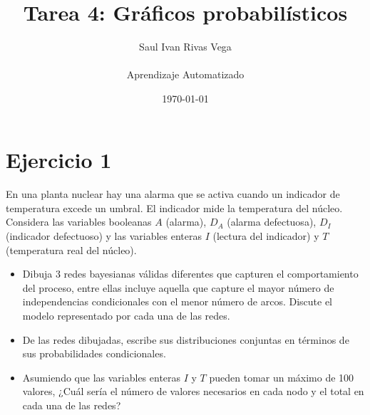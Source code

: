 \documentclass[12pt]{article}
\title{Tarea 4: Gráficos probabilísticos}
\author{
	Saul Ivan Rivas Vega \\
	\\
	Aprendizaje Automatizado\\
}
\date{\today}
\begin{document}
	\maketitle
	\pagebreak
	\section{Ejercicio 1}
	  \paragraph{} En una planta nuclear hay una alarma que se activa cuando un indicador de temperatura excede un umbral. El indicador mide la temperatura del núcleo. Considera las variables booleanas $A$ (alarma), $D_A$ (alarma defectuosa), $D_I$ (indicador defectuoso) y las variables enteras $I$ (lectura del indicador) y $T$ (temperatura real del núcleo).
	  \begin{itemize}
		\item Dibuja 3 redes bayesianas válidas diferentes que capturen el comportamiento del proceso, entre ellas incluye aquella que capture el mayor número de independencias condicionales con el menor número de arcos. Discute el modelo representado por cada una de las redes.
		\item De las redes dibujadas, escribe sus distribuciones conjuntas en términos de sus probabilidades condicionales.
		\item Asumiendo que las variables enteras $I$ y $T$ pueden tomar un máximo de 100 valores, ¿Cuál sería el número de valores necesarios en cada nodo y el total en cada una de las redes?
	  \end{itemize}
\end{document}
